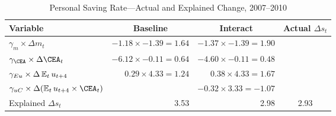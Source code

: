 \hypertarget{tPred}{}  
\begin{table}
\caption{ Personal Saving Rate---Actual and Explained Change, 2007--2010} \label{tPred} 
\begin{center}
\begin{tabular}{@{}lrrc@{}}\\
\toprule
     Variable & \multicolumn{1}{c}{Baseline }& \multicolumn{1}{c}{Interact }& \multicolumn{1}{c}{Actual $\Delta s_t$ }\\
\midrule 
$\gamma_m\times\Delta m_t$ & $ -1.18 \times -1.39 = 1.64 $ & $ -1.37 \times -1.39 = 1.90 $ & \\
$\gamma_\CEA\times\Delta \CEA_t$ & $ -6.12 \times -0.11 = 0.64 $ & $ -4.60 \times -0.11 = 0.48 $ &  \\
$\gamma_{Eu}\times\Delta \operatorname{\mathbb{E}}_t u_{t+4} $ & $ 0.29 \times 4.33 = 1.24 $ & $ 0.38 \times 4.33 = 1.67 $ & \\
$\gamma_{uC}\times\Delta (\Ex_t u_{t+4}\times\CEA_t) $ &  & $ -0.32 \times 3.33 = -1.07 $ &  \\\midrule
Explained $\Delta s_t$ &  3.53 &  2.98 & 2.93\\
\bottomrule
\end{tabular}
\end{center}
\end{table} 
